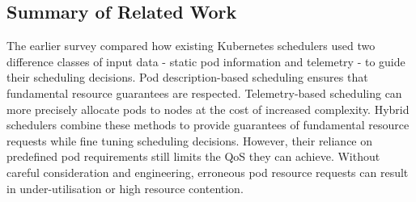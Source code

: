 %
%
%
%
%
%

\subsection{Summary of Related Work}
The earlier survey compared how existing Kubernetes schedulers used two
difference classes of input data - static pod information and telemetry - to
guide their scheduling decisions. Pod description-based scheduling ensures that
fundamental resource guarantees are respected. Telemetry-based scheduling can
more precisely allocate pods to nodes at the cost of increased complexity.
Hybrid schedulers combine these methods to provide guarantees of fundamental
resource requests while fine tuning scheduling decisions. However, their
reliance on predefined pod requirements still limits the QoS they can achieve.
Without careful consideration and engineering, erroneous pod resource requests
can result in under-utilisation or high resource contention.


